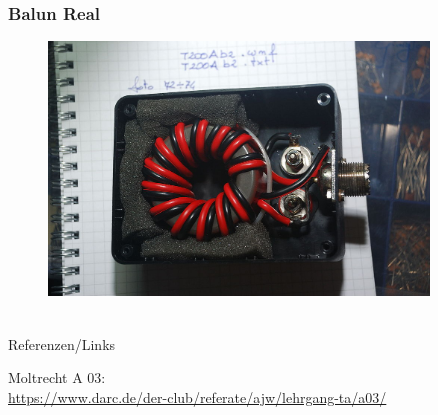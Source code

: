 \begin{frame}
  \frametitle{Balun Real}
  \begin{center}
    \begin{figure}
      \includegraphics[width=0.9\textwidth,height=.75\textheight,keepaspectratio]{a03/balun-Real.jpg}
    \end{figure}
  \end{center}
\end{frame}


\renewcommand{\refname}{Referenzen}

\hypertarget{refs}{}
\textcolor{white}{} \\ %
\Large Referenzen/Links
\footnotesize

\begin{thebibliography}{}
   Moltrecht A 03: \\
    \url{https://www.darc.de/der-club/referate/ajw/lehrgang-ta/a03/}

\end{thebibliography}


